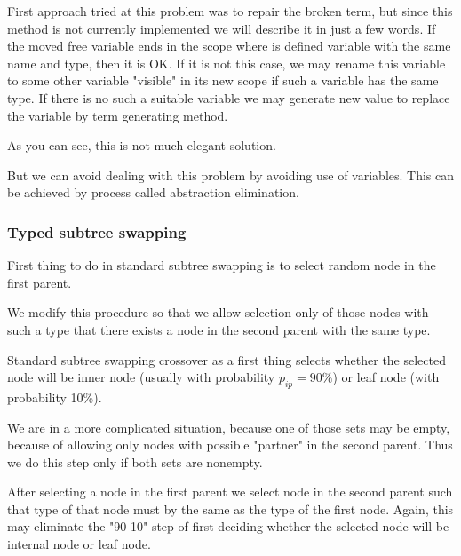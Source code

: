 \documentclass{sig-alternate}
\begin{document}



First approach tried at this problem was to repair the broken term,
but since this method is not currently implemented we will describe it
in just a few words. If the moved free variable ends in the scope 
where is defined variable with the same name and type, then it
is OK. If it is not this case, we may rename this variable to some 
other variable "visible" in its new scope if such a variable has the same 
type. If there is no such a suitable variable we may generate new value 
to replace the variable by term generating method. 

As you can see, this is not much elegant solution. 

But we can avoid dealing with this problem by avoiding use of variables.
This can be achieved by process called abstraction elimination.
 



\subsubsection{Typed subtree swapping}
\label{typed-swapping}

First thing to do in standard subtree swapping is to select random node
in the first parent. 

We modify this procedure so that we allow
selection only of those nodes with such a type that there exists  
a node in the second parent with the same type.

Standard subtree swapping crossover as a first thing selects 
whether the selected node will be inner node (usually with probability 
$p_{ip} = 90\%$) or leaf node (with probability 10\%).

We are in a more complicated situation, because one of those 
sets may be empty, because of allowing only nodes with possible "partner"
in the second parent. Thus we do this step only if both sets are
nonempty. 

After selecting a node in the first parent we select node in the
second parent such that type of that node must by the same as the type 
of the first node. Again, this may eliminate the "90-10" step of
first deciding whether the selected node will be internal node 
or leaf node.
\end{document}
